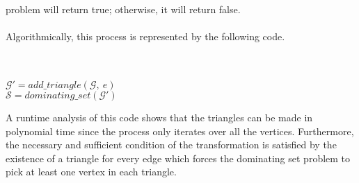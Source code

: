 \documentclass[12pt]{article}
\begin{document}
problem will return true; otherwise, it will return false.\\\\
Algorithmically, this process is represented by the following code.\\
\begin{algorithm}[H]
\\
\\
{
    $\mathcal{G'}=add\_triangle(\mathcal{G},\ e)$\\
}
$\mathcal{S}=dominating\_set(\mathcal{G'})$\\
{
}
\Else
{
}
\end{algorithm}
A runtime analysis of this code shows that the triangles can be made in polynomial
time since the process only iterates over all the vertices. Furthermore, the 
necessary and sufficient condition of the transformation is satisfied by the 
existence of a triangle for every edge which forces the dominating set 
problem to pick at least one vertex in each triangle.  
\end{document}
